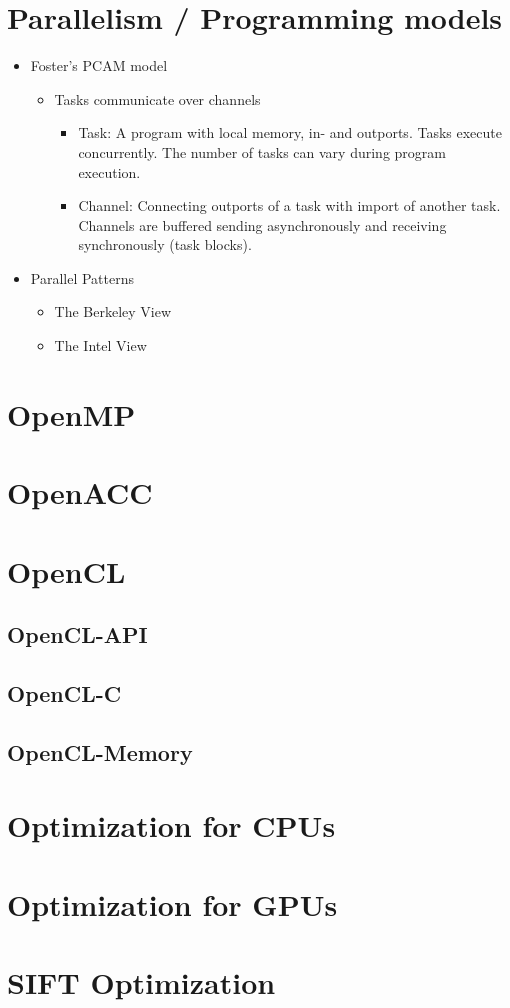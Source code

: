 \documentclass[paper=a4, fontsize=11pt]{scrartcl} %
\numberwithin{equation}{section} %
\numberwithin{figure}{section} %
\numberwithin{table}{section} %
\begin{document}
\section{Parallelism / Programming models}

\begin{itemize}
  \item Foster's PCAM model
  \begin{itemize}
    \item Tasks communicate over channels
    \begin{itemize}
      \item Task: A program with local memory, in- and outports. Tasks execute concurrently. The number of tasks can vary during program execution.
      \item Channel: Connecting outports of a task with import of another task. Channels are buffered sending asynchronously and receiving synchronously (task blocks).
    \end{itemize}
  \end{itemize}
  \item Parallel Patterns
  \begin{itemize}
    \item The Berkeley View
    \item The Intel View
  \end{itemize}
\end{itemize}

\section{OpenMP}

\section{OpenACC}

\section{OpenCL}

\subsection{OpenCL-API}

\subsection{OpenCL-C}

\subsection{OpenCL-Memory}

\section{Optimization for CPUs}

\section{Optimization for GPUs}

\section{SIFT Optimization}
\end{document}
